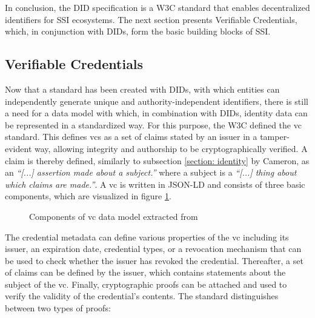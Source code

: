         In conclusion, the \ac{DID} specification is a W3C standard that enables decentralized identifiers for \ac{SSI} ecosystems. The next section presents Verifiable Credentials, which, in conjunction with \acp{DID}, form the basic building blocks of \ac{SSI}.
	    
	    \subsection{Verifiable Credentials}\label{subsection: vc}
	    
	    Now that a standard has been created with \acp{DID}, with which entities can independently generate unique and authority-independent identifiers, there is still a need for a data model with which, in combination with \acp{DID}, identity data can be represented in a standardized way. For this purpose, the W3C defined the \acf{vc} standard. This defines \acp{vc} as a set of claims stated by an issuer in a tamper-evident way, allowing integrity and authorship to be cryptographically verified. A claim is thereby defined, similarly to subsection \ref{section: identity} by Cameron, as an \textit{“[...] assertion made about a subject.”} where a subject is a \textit{“[...] thing about which claims are made.”}. A \ac{vc} is written in JSON-LD and consists of three basic components, which are visualized in figure \ref{figure: vc components}. \cite{sporny_verifiable_2019}
	    
	    \begin{figure}[ht]
    	    \centering
    	    \makebox[\textwidth]{}
            \caption{Components of \ac{vc} data model extracted from \cite{sporny_verifiable_2019}}
            \label{figure: vc components}
        \end{figure}
        
        The credential metadata can define various properties of the \ac{vc} including its issuer, an expiration date, credential types, or a revocation mechanism that can be used to check whether the issuer has revoked the credential. Thereafter, a set of claims can be defined by the issuer, which contains statements about the subject of the \ac{vc}. Finally, cryptographic proofs can be attached and used to verify the validity of the credential's contents. The standard distinguishes between two types of proofs: \cite{sporny_verifiable_2019}
        

